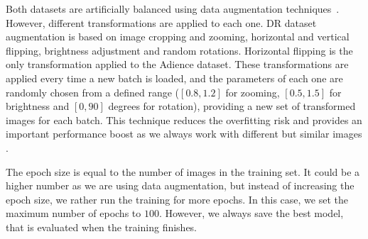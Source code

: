 \documentclass[journal]{IEEEtran}
\begin{document}
	Both datasets are artificially balanced using data augmentation techniques~\cite{van2001art}. However, different transformations are applied to each one. DR dataset augmentation is based on image cropping and zooming, horizontal and vertical flipping, brightness adjustment and random rotations. Horizontal flipping is the only transformation applied to the Adience dataset. These transformations are applied every time a new batch is loaded, and the parameters of each one are randomly chosen from a defined range ($[0.8, 1.2]$ for zooming, $[0.5, 1.5]$ for brightness and $[0, 90]$ degrees for rotation), providing a new set of transformed images for each batch. This technique reduces the overfitting risk and provides an important performance boost as we always work with different but similar images \cite{krizhevsky2012imagenet}.
	
	The epoch size is equal to the number of images in the training set. It could be a higher number as we are using data augmentation, but instead of increasing the epoch size, we rather run the training for more epochs. In this case, we set the maximum number of epochs to $100$. However, we always save the best model, that is evaluated when the training finishes.
	
\end{document}
